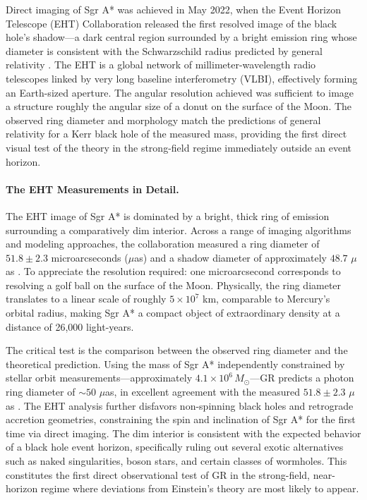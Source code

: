 \documentclass[12pt, a4paper]{article}
\begin{document}
	Direct imaging of Sgr A* was achieved in May 2022, when the Event Horizon Telescope (EHT) Collaboration released the first resolved image of the black hole's shadow---a dark central region surrounded by a bright emission ring whose diameter is consistent with the Schwarzschild radius predicted by general relativity \citep{AstronomersSnapFirstever2022}. The EHT is a global network of millimeter-wavelength radio telescopes linked by very long baseline interferometry (VLBI), effectively forming an Earth-sized aperture. The angular resolution achieved was sufficient to image a structure roughly the angular size of a donut on the surface of the Moon. The observed ring diameter and morphology match the predictions of general relativity for a Kerr black hole of the measured mass, providing the first direct visual test of the theory in the strong-field regime immediately outside an event horizon.
	
	\paragraph{The EHT Measurements in Detail.}
	The EHT image of Sgr A* is dominated by a bright, thick ring of emission surrounding a comparatively dim interior. Across a range of imaging algorithms and modeling approaches, the collaboration measured a ring diameter of $51.8 \pm 2.3$ microarcseconds ($\mu$as) and a shadow diameter of approximately $48.7$ $\mu$as \citep{AstronomersSnapFirstever2022}. To appreciate the resolution required: one microarcsecond corresponds to resolving a golf ball on the surface of the Moon. Physically, the ring diameter translates to a linear scale of roughly $5 \times 10^7$ km, comparable to Mercury's orbital radius, making Sgr A* a compact object of extraordinary density at a distance of 26,000 light-years.
	
	The critical test is the comparison between the observed ring diameter and the theoretical prediction. Using the mass of Sgr A* independently constrained by stellar orbit measurements---approximately $4.1 \times 10^6\,M_\odot$---GR predicts a photon ring diameter of $\sim$$50$ $\mu$as, in excellent agreement with the measured $51.8 \pm 2.3$ $\mu$as \citep{AstronomersSnapFirstever2022}. The EHT analysis further disfavors non-spinning black holes and retrograde accretion geometries, constraining the spin and inclination of Sgr A* for the first time via direct imaging. The dim interior is consistent with the expected behavior of a black hole event horizon, specifically ruling out several exotic alternatives such as naked singularities, boson stars, and certain classes of wormholes. This constitutes the first direct observational test of GR in the strong-field, near-horizon regime where deviations from Einstein's theory are most likely to appear.
	
\end{document}

